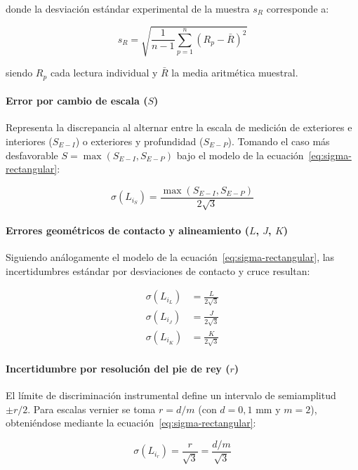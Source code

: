 donde la desviación estándar experimental de la muestra $s_R$ corresponde a:

\begin{equation}
    s_R = \sqrt{\frac{1}{n-1} \sum_{p=1}^n (R_p - \bar{R})^2}
    \label{eq:desv-estandar-muestral}
\end{equation}

siendo $R_p$ cada lectura individual y $\bar{R}$ la media aritmética muestral.

\paragraph{Error por cambio de escala ($S$)}
Representa la discrepancia al alternar entre la escala de medición de exteriores e interiores ($S_{E-I}$) o exteriores y profundidad ($S_{E-P}$). Tomando el caso más desfavorable $S = \max(S_{E-I}, S_{E-P})$ bajo el modelo de la ecuación~\eqref{eq:sigma-rectangular}:

\begin{equation}
    \sigma(L_{i_S}) = \frac{\max(S_{E-I}, S_{E-P})}{2\sqrt{3}}
    \label{eq:sigma-LiS}
\end{equation}

\paragraph{Errores geométricos de contacto y alineamiento ($L$, $J$, $K$)}
Siguiendo análogamente el modelo de la ecuación~\eqref{eq:sigma-rectangular}, las incertidumbres estándar por desviaciones de contacto y cruce resultan:

\begin{align}
    \sigma(L_{i_L}) &= \frac{L}{2\sqrt{3}} \label{eq:sigma-LiL} \\
    \sigma(L_{i_J}) &= \frac{J}{2\sqrt{3}} \label{eq:sigma-LiJ} \\
    \sigma(L_{i_K}) &= \frac{K}{2\sqrt{3}} \label{eq:sigma-LiK}
\end{align}

\paragraph{Incertidumbre por resolución del pie de rey ($r$)}
El límite de discriminación instrumental define un intervalo de semiamplitud $\pm r/2$. Para escalas vernier se toma $r = d/m$ (con $d = 0{,}1\text{ mm}$ y $m = 2$), obteniéndose mediante la ecuación~\eqref{eq:sigma-rectangular}:

\begin{equation}
    \sigma(L_{i_r}) = \frac{r}{\sqrt{3}} = \frac{d / m}{\sqrt{3}}
    \label{eq:sigma-Lir}
\end{equation}

